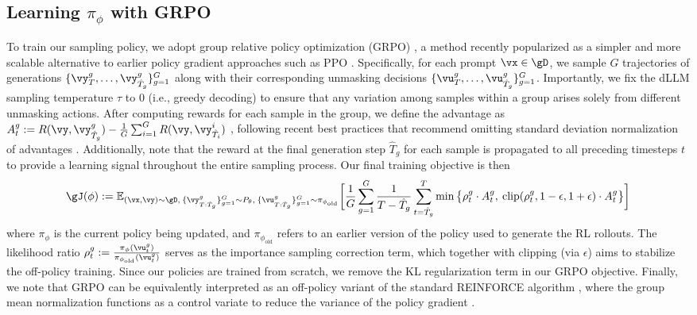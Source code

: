 \subsection{Learning $\pi_\phi$ with GRPO}
\label{sec:methods_grpo}
To train our sampling policy, we adopt group relative policy optimization (GRPO) \citep{shao2024deepseekmath}, a method recently popularized as a simpler and more scalable alternative to earlier policy gradient approaches such as PPO \citep{schulman2017proximal}. Specifically, for each prompt $\vx \in \gD$, we sample $G$ trajectories of generations $\{\vy_T^g, \ldots, \vy_{\hat{T}_g}^g \}_{g=1}^G$ along with their corresponding unmasking decisions $\{\vu_T^g, \ldots, \vu_{\hat{T}_g}^g \}_{g=1}^G$. Importantly, we fix the dLLM sampling temperature $
\tau$ to $0$ (i.e., greedy decoding) to ensure that any variation among samples within a group arises solely from different unmasking actions. After computing rewards for each sample in the group, we define the advantage as $A_t^g := R(\vy, \vy_{\hat{T}_g}^g) - \frac{1}{G} \sum_{i=1}^G R(\vy, \vy_{\hat{T}_i}^i)$ , following recent best practices that recommend omitting standard deviation normalization of advantages \citep{zhao2025d1}. Additionally, note that the reward at the final generation step $\hat{T}_g$ for each sample is propagated to all preceding timesteps $t$ to provide a learning signal throughout the entire sampling process. Our final training objective is then
\begin{align*}
    \gJ(\phi) := \mathbb{E}_{(\vx, \vy) \sim \gD, \: \{\vy_{T:\hat{T}_g}^g \}_{g=1}^G \sim P_{\theta}, \: \{\vu_{T:\hat{T}_g}^g \}_{g=1}^G \sim \pi_{\phi_{\text{old}}}} \bigg[\frac{1}{G}\sum_{g=1}^G \frac{1}{T - \hat{T}_g}\sum_{t=\hat{T}_g}^{T} \min \big\{\rho_t^g \cdot A_t^g , \: \text{clip}(\rho_t^g, 1 - \epsilon, 1 + \epsilon) \cdot A_t^g \big\} \bigg]
\end{align*}
where $\pi_{\phi}$ is the current policy being updated, and $\pi_{\phi_{\text{old}}}$ refers to an earlier version of the policy used to generate the RL rollouts. The likelihood ratio  $\rho_t^g := \frac{\pi_{\phi}(\vu_t^g)}{\pi_{\phi_{\text{old}}}(\vu_t^g)}$ serves as the importance sampling correction term, which together with clipping (via $\epsilon$) aims to stabilize the off-policy training. Since our policies are trained from scratch, we remove %
the KL regularization term in our GRPO objective. Finally, we note that GRPO can be equivalently interpreted as an off-policy variant of the standard REINFORCE algorithm \citep{williams1992simple}, where the group mean normalization functions as a control variate to reduce the variance of the policy gradient \citep{mohamed2020monte}.

